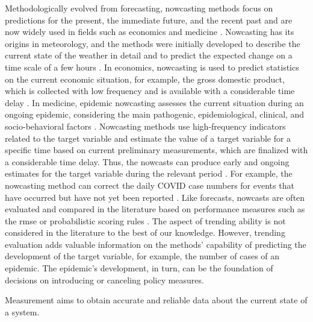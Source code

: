 Methodologically evolved from forecasting, nowcasting methods focus on predictions for the present, the immediate future, and the recent past \parencite{banbura2013now} and are now widely used in fields such as economics and medicine \parencite{bok2018macroeconomic, Wolffram2023}.
Nowcasting has its origins in meteorology, and the methods were initially developed to describe the current state of the weather in detail and to predict the expected change on a time scale of a few hours \parencite{browning1989nowcasting,schmid2019nowcasting}. 
In economics, nowcasting is used to predict statistics on the current economic situation, for example, the gross domestic product, which is collected with low frequency and is available with a considerable time delay \parencite{banbura2013now}.
In medicine, epidemic nowcasting assesses the current situation during an ongoing epidemic, considering the main pathogenic, epidemiological, clinical, and socio-behavioral factors \parencite{wu2021nowcasting}. 
Nowcasting methods use high-frequency indicators related to the target variable and estimate the value of a target variable for a specific time based on current preliminary measurements, which are finalized with a considerable time delay. 
Thus, the nowcasts can produce early and ongoing estimates for the target variable during the relevant period \parencite{castle2017forecasting}. 
For example, the nowcasting method can correct the daily COVID case numbers for events that have occurred but have not yet been reported \parencite{gunther2021nowcasting}. 
Like forecasts, nowcasts are often evaluated and compared in the literature based on performance measures such as the \ac{rmse} \parencite{gunther2021nowcasting} or probabilistic scoring rules \parencite{Wolffram2023}. 
The aspect of trending ability is not considered in the literature to the best of our knowledge. 
However, trending evaluation adds valuable information on the methods' capability of predicting the development of the target variable, for example, the number of cases of an epidemic.
The epidemic's development, in turn, can be the foundation of decisions on introducing or canceling policy measures. 

Measurement aims to obtain accurate and reliable data about the current state of a system. 

